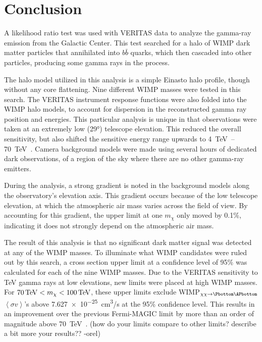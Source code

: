 \cleartooddpage[\thispagestyle{empty}]
\chapter{Conclusion}

A likelihood ratio test was used with VERITAS data to analyze the gamma-ray emission from the Galactic Center.
This test searched for a halo of WIMP dark matter particles that annihilated into $b\bar{b}$ quarks, which then cascaded into other particles, producing some gamma rays in the process.

The halo model utilized in this analysis is a simple Einasto halo profile, though without any core flattening.
Nine different WIMP masses were tested in this search.
The VERITAS instrument response functions were also folded into the WIMP halo models, to account for dispersion in the reconstructed gamma ray position and energies.
This particular analysis is unique in that observations were taken at an extremely low (\nicetilde{}\ang{29}) telescope elevation.
This reduced the overall sensitivity, but also shifted the sensitive energy range upwards to \SIrange{4}{70}{\TeV{}}.
Camera background models were made using several hours of dedicated dark observations, of a region of the sky where there are no other gamma-ray emitters.

During the analysis, a strong gradient is noted in the background models along the observatory's elevation axis.
This gradient occurs because of the low telescope elevation, at which the atmospheric air mass varies across the field of view.
By accounting for this gradient, the upper limit at one $m_{\chi}$ only moved by 0.1\%, indicating it does not strongly depend on the atmospheric air mass.

The result of this analysis is that no significant dark matter signal was detected at any of the WIMP masses.
To illuminate what WIMP candidates were ruled out by this search, a cross section upper limit at a confidence level of 95\% was calculated for each of the nine WIMP masses.
Due to the VERITAS sensitivity to TeV gamma rays at low elevations, new limits were placed at high WIMP masses.
For $70\,\TeV<m_{\chi}<100\,\TeV$, these upper limits exclude WIMP$_{\chi\chi\rightarrow\Pbottom\APbottom}$ $\left \langle \sigma v \right \rangle$'s above \SI{7.627e-25}{cm^3/s} at the 95\% confidence level.
This results in an improvement over the previous Fermi-MAGIC limit by more than an order of magnitude above \SI{70}{\TeV{}}.
{\color{red}(how do your limits compare to other limits? describe a bit more your results?? -orel)}

